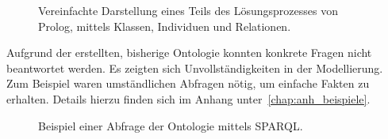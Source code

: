\begin{figure}[H]
\centering {}
\caption{Vereinfachte Darstellung eines Teils des Lösungsprozesses von Prolog, mittels Klassen, Individuen und Relationen.\label{fig:prolog_loesungsprozess}\protect\footnotemark}
\end{figure}

Aufgrund der erstellten, bisherige Ontologie konnten konkrete Fragen nicht beantwortet werden. Es zeigten sich Unvollständigkeiten in der Modellierung. Zum Beispiel waren umständlichen Abfragen nötig, um einfache Fakten zu erhalten. Details hierzu finden sich im Anhang unter~\ref{chap:anh_beispiele}.

\begin{figure}[H]
\centering {}
\caption{Beispiel einer Abfrage der Ontologie mittels SPARQL.\label{fig:sparql_beispiel}\protect\footnotemark}
\end{figure}

